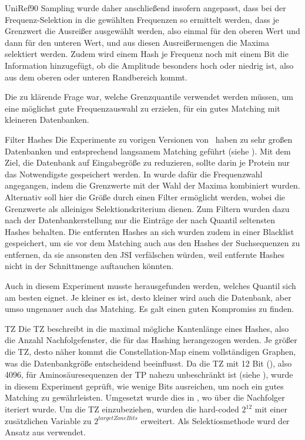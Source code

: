\begin{experiment}{UniRef90 Sampling}
         wurde daher anschließend insofern angepasst, dass bei der Frequenz-Selektion in  die gewählten Frequenzen so ermittelt werden, dass je Grenzwert die Ausreißer ausgewählt werden, also einmal für den oberen Wert und dann für den unteren Wert, und aus diesen Ausreißermengen die Maxima selektiert werden. Zudem wird einem Hash je Frequenz noch mit einem Bit die Information hinzugefügt, ob die Amplitude besonders hoch oder niedrig ist, also aus dem oberen oder unteren Randbereich kommt.

        Die zu klärende Frage war, welche Grenzquantile verwendet werden müssen, um eine möglichst gute Frequenzauswahl zu erzielen, für ein gutes Matching mit kleineren Datenbanken.
    \end{experiment}
    \begin{experiment}{Filter Hashes} %
        \label{exp:filter_hashes}
        Die Experimente zu vorigen Versionen von \protfin\ haben zu sehr großen Datenbanken und entsprechend langsamem Matching geführt (siehe ). Mit dem Ziel, die Datenbank auf Eingabegröße zu reduzieren, sollte darin je Protein nur das Notwendigste gespeichert werden. In  wurde dafür die Frequenzwahl angegangen, indem die Grenzwerte mit der Wahl der Maxima kombiniert wurden. Alternativ soll hier die Größe durch einen Filter ermöglicht werden, wobei die Grenzwerte als alleiniges Selektionskriterium dienen. Zum Filtern wurden dazu nach der Datenbankerstellung nur die Einträge der nach Quantil seltensten Hashes behalten. Die entfernten Hashes an sich wurden zudem in einer Blacklist gespeichert, um sie vor dem Matching auch aus den Hashes der Suchsequenzen zu entfernen, da sie ansonsten den \ac{JSI} verfälschen würden, weil entfernte Hashes nicht in der Schnittmenge auftauchen könnten.

        Auch in diesem Experiment musste herausgefunden werden, welches Quantil sich am besten eignet. Je kleiner es ist, desto kleiner wird auch die Datenbank, aber umso ungenauer auch das Matching. Es galt einen guten Kompromiss zu finden.
    \end{experiment}
    \begin{experiment}{\acl{TZ}} %
        \label{exp:target_zone}
        Die \ac{TZ} beschreibt in  die maximal mögliche Kantenlänge eines Hashes, also die Anzahl Nachfolgefenster, die für das Hashing herangezogen werden. Je größer die \ac{TZ}, desto näher kommt die Constellation-Map einem vollständigen Graphen, was die Datenbankgröße entscheidend beeinflusst. Da die \ac{TZ} mit 12 Bit (), also 4096, für Aminosäuresequenzen der \ac{TP} nahezu unbeschränkt ist (siehe ), wurde in diesem Experiment geprüft, wie wenige Bits ausreichen, um noch ein gutes Matching zu gewährleisten. Umgesetzt wurde dies in , wo über die Nachfolger iteriert wurde. Um die \ac{TZ} einzubeziehen, wurden die hard-coded $2^{12}$ mit einer zusätzlichen Variable zu $2^{targetZoneBits}$ erweitert. Als Selektiosmethode wurd der Ansatz aus  verwendet.
    \end{experiment}
